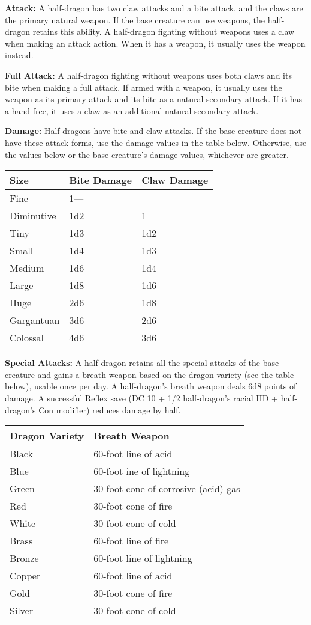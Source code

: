 \documentclass{article}
\begin{document}
\textbf{Attack: }A half-dragon has two claw attacks and a bite attack, and the 
claws are the primary natural weapon. If the base creature can use weapons, the 
half-dragon retains this ability. A half-dragon fighting without weapons uses a 
claw when making an attack action. When it has a weapon, it usually uses the weapon 
instead.

\textbf{Full Attack:} A half-dragon fighting without weapons uses both claws and 
its bite when making a full attack. If armed with a weapon, it usually uses the 
weapon as its primary attack and its bite as a natural secondary attack. If it 
has a hand free, it uses a claw as an additional natural secondary attack.

\textbf{Damage:} Half-dragons have bite and claw attacks. If the base creature 
does not have these attack forms, use the damage values in the table below. Otherwise, 
use the values below or the base creature's damage values, whichever are greater.

\begin{tabular}{|>{\raggedright}p{45pt}|>{\raggedright}p{53pt}|>{\raggedright}p{58pt}|}
\hline
S\textbf{ize} & B\textbf{ite Damage} & C\textbf{law Damage}\tabularnewline
\hline
Fine & 1--- & \tabularnewline
\hline
Diminutive & 1d2 & 1\tabularnewline
\hline
Tiny & 1d3 & 1d2\tabularnewline
\hline
Small & 1d4 & 1d3\tabularnewline
\hline
Medium & 1d6 & 1d4\tabularnewline
\hline
Large & 1d8 & 1d6\tabularnewline
\hline
Huge & 2d6 & 1d8\tabularnewline
\hline
Gargantuan & 3d6 & 2d6\tabularnewline
\hline
Colossal & 4d6 & 3d6\tabularnewline
\hline
\end{tabular}

\textbf{Special Attacks:} A half-dragon retains all the special attacks of the 
base creature and gains a breath weapon based on the dragon variety (see the table 
below), usable once per day. A half-dragon's breath weapon deals 6d8 points of 
damage. A successful Reflex save (DC 10 + 1/2 half-dragon's racial HD + half-dragon's 
Con modifier) reduces damage by half.

\begin{tabular}{|>{\raggedright}p{70pt}|>{\raggedright}p{146pt}|}
\hline
D\textbf{ragon Variety} & B\textbf{reath Weapon}\tabularnewline
\hline
Black & 60-foot line of acid\tabularnewline
\hline
Blue & 60-foot ine of lightning\tabularnewline
\hline
Green & 30-foot cone of corrosive (acid) gas\tabularnewline
\hline
Red & 30-foot cone of fire\tabularnewline
\hline
White & 30-foot cone of cold\tabularnewline
\hline
Brass & 60-foot line of fire\tabularnewline
\hline
Bronze & 60-foot line of lightning\tabularnewline
\hline
Copper & 60-foot line of acid\tabularnewline
\hline
Gold & 30-foot cone of fire\tabularnewline
\hline
Silver & 30-foot cone of cold\tabularnewline
\hline
\end{tabular}
\end{document}
